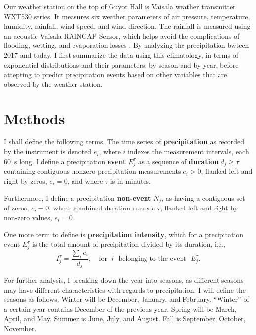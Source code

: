\documentclass[11pt]{report}
\newcommand{\fracd}[2]{\frac{\displaystyle{#1}}{\displaystyle{#2}}}
\begin{document}
% 

Our weather station on the top of Guyot Hall is Vaisala weather
transmitter WXT530 series. It measures six weather parameters of air
pressure, temperature, humidity, rainfall, wind speed, and wind
direction. The rainfall is measured using an acoustic Vaisala RAINCAP
Sensor, which helps avoid the complications of flooding, wetting, and
evaporation losses \cite[]{Vaisala}. By analyzing the precipitation
bwteen 2017 and today, I first summarize the data using this
climatology, in terms of exponential distributions and their
parameters, by season and by year, before attepting to predict
precipitation events based on other variables that are observed by the
weather station.

\section{Methods \label{sec:methods}}

I shall define the following terms. The time series of
\textbf{precipitation} as recorded by the instrument is denoted $e_i$,
where $i$ indexes the measurement intervals, each 60~s long. I define
a precipitation \textbf{event} $E_j^\tau $ as a sequence of
\textbf{duration} $d_j\ge \tau$ containing contiguous nonzero
precipitation measurements $e_i>0$, flanked left and right by zeros,
$e_i=0$, and where $\tau$ is in minutes.

Furthermore, I define a precipitation \textbf{non-event} $N_j^\tau$,
  as having a contiguous set of zeros, $e_i=0$, whose combined duration
  exceeds $\tau$, flanked left and right by non-zero values, $e_i=0$.

One more term to define is \textbf{precipitation intensity}, which for
a precipitation event $E_j^\tau$ is the total amount of precipitation
divided by its duration, i.e., 
\begin{equation}
I_j^\tau = \fracd{\sum_i e_i }{d_j} ,
\quad
\mbox{for}\,\,\,\, i\,\,\,\, \mbox{belonging to the event}\,\,\,\, E_j^\tau
.
\end{equation}


For further analysis, I breaking down the year into seasons, as
different seasons may have different characteristics with regards to
precipitation. I will define the seasons as follows: Winter will be
December, January, and February. ``Winter'' of a certain year contains
December of the previous year.  Spring will be March, April, and
May. Summer is June, July, and August. Fall is September, October,
November.
\end{document}
